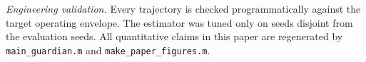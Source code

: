 \documentclass[conference]{IEEEtran}
\begin{document}
\textit{Engineering validation.} Every trajectory is checked
programmatically against the target operating envelope. The estimator was tuned only on seeds
disjoint from the evaluation seeds. All quantitative claims in this paper are
regenerated by \texttt{main\_guardian.m} and \texttt{make\_paper\_figures.m}.
\end{document}
